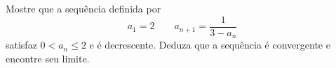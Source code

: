 \item\label{caushw}	Mostre que a sequência definida por
$$a_1 = 2 \quad \quad a_{n+1} = \frac{1}{3 - a_n}$$
satisfaz $0 < a_n \leq 2$ e é decrescente. Deduza que a sequência é
convergente e encontre seu limite.